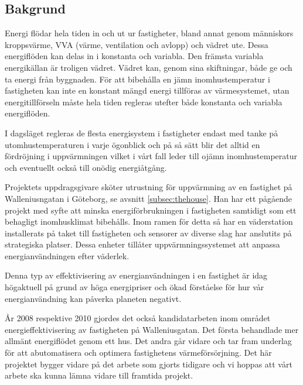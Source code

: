 \subsection{Bakgrund}

Energi flödar hela tiden in och ut ur fastigheter, bland annat genom människors kroppsvärme, VVA (värme, ventilation och avlopp) och vädret ute. Dessa energiflöden kan delas in i konstanta och variabla. Den främsta variabla energikällan är troligen vädret. Vädret kan, genom sina skiftningar, både ge och ta energi från byggnaden. För att bibehålla en jämn inomhustemperatur i fastigheten kan inte en konstant mängd energi tillföras av värmesystemet, utan energitillförseln måste hela tiden regleras utefter både konstanta och variabla energiflöden.

I dagsläget regleras de flesta energisystem i fastigheter endast med tanke på utomhustemperaturen i varje ögonblick och på så sätt blir det alltid en fördröjning i uppvärmningen vilket i vårt fall leder till ojämn inomhustemperatur och eventuellt också till onödig energiåtgång.

Projektets uppdragsgivare sköter utrustning för uppvärmning av en fastighet på Walleniusngatan i Göteborg, se avsnitt \ref{subsec:thehouse}. Han har ett pågående projekt med syfte att minska energiförbrukningen i fastigheten samtidigt som ett behagligt inomhusklimat bibehålls. Inom ramen för detta så har en väderstation installerats på taket till fastigheten och sensorer av diverse slag har anslutits på strategiska platser.  Dessa enheter tillåter uppvärmningssystemet att anpassa energianvändningen efter väderlek.

Denna typ av effektivisering av energianvändningen i en fastighet är idag högaktuell på grund av höga energipriser och ökad förståelse för hur vår energianvändning kan påverka planeten negativt.

År 2008 respektive 2010 gjordes det också kandidatarbeten inom området energieffektivisering av fastigheten på Walleniusgatan. Det första\cite{kandidatarbete2008} behandlade mer allmänt energiflödet genom ett hus. Det andra\cite{kandidatarbete2010} går vidare och tar fram underlag för att abutomatisera och optimera fastighetens värmeförsörjning. Det här projektet bygger vidare på det arbete som gjorts tidigare och vi hoppas att vårt arbete ska kunna lämna vidare till framtida projekt.